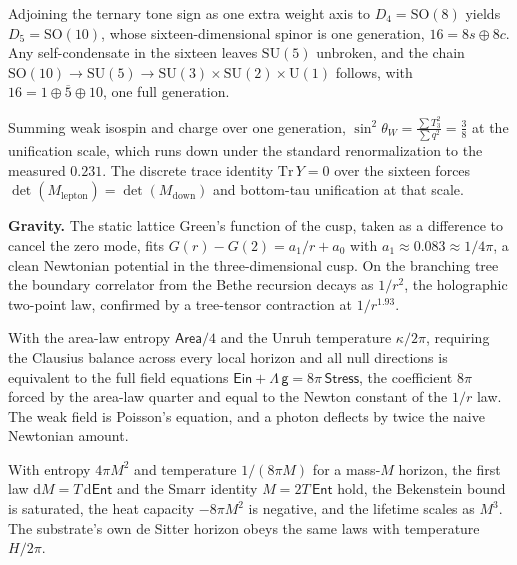 \begin{proposition}
Adjoining the ternary tone sign as one extra weight axis to $D_4 = \mathrm{SO}(8)$ yields $D_5 = \mathrm{SO}(10)$, whose sixteen-dimensional spinor is one generation, $16 = 8s \oplus 8c$. Any self-condensate in the sixteen leaves $\mathrm{SU}(5)$ unbroken, and the chain $\mathrm{SO}(10) \to \mathrm{SU}(5) \to \mathrm{SU}(3) \times \mathrm{SU}(2) \times \mathrm{U}(1)$ follows, with $16 = 1 \oplus \overline{5} \oplus 10$, one full generation.
\end{proposition}

\begin{result}
Summing weak isospin and charge over one generation, $\sin^2\theta_W = \frac{\sum T_3^2}{\sum q^2} = \frac{3}{8}$ at the unification scale, which runs down under the standard renormalization to the measured $0.231$. The discrete trace identity $\mathrm{Tr}\,Y = 0$ over the sixteen forces $\det(M_{\mathrm{lepton}}) = \det(M_{\mathrm{down}})$ and bottom-tau unification at that scale. \cite{pollard2026vibetest}
\end{result}

\textbf{Gravity.} The static lattice Green's function of the cusp, taken as a difference to cancel the zero mode, fits $G(r) - G(2) = a_1/r + a_0$ with $a_1 \approx 0.083 \approx 1/4\pi$, a clean Newtonian potential in the three-dimensional cusp. On the branching tree the boundary correlator from the Bethe recursion decays as $1/r^2$, the holographic two-point law, confirmed by a tree-tensor contraction at $1/r^{1.93}$.

\begin{result}
With the area-law entropy $\mathsf{Area}/4$ and the Unruh temperature $\kappa/2\pi$, requiring the Clausius balance across every local horizon and all null directions is equivalent to the full field equations $\mathsf{Ein} + \Lambda\,\mathsf{g} = 8\pi\,\mathsf{Stress}$, the coefficient $8\pi$ forced by the area-law quarter and equal to the Newton constant of the $1/r$ law. The weak field is Poisson's equation, and a photon deflects by twice the naive Newtonian amount. \cite{pollard2026vibetest}
\end{result}

\begin{result}
With entropy $4\pi M^2$ and temperature $1/(8\pi M)$ for a mass-$M$ horizon, the first law $\mathrm{d}M = T\,\mathrm{d}\mathsf{Ent}$ and the Smarr identity $M = 2 T\,\mathsf{Ent}$ hold, the Bekenstein bound is saturated, the heat capacity $-8\pi M^2$ is negative, and the lifetime scales as $M^3$. The substrate's own de Sitter horizon obeys the same laws with temperature $H/2\pi$. \cite{pollard2026vibetest}
\end{result}

